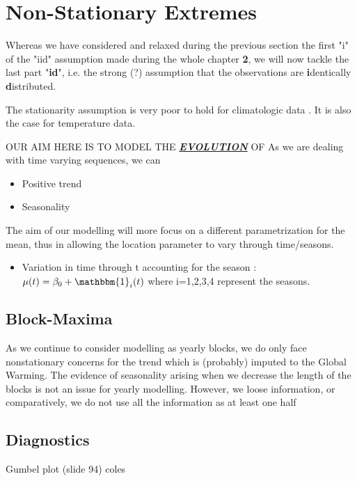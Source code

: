 \documentclass[11pt,a4paper,openany ]{book}
\begin{document}
\section{Non-Stationary Extremes}\label{nstatio}

Whereas we have considered and relaxed during the previous section the first "i" of the "iid" assumption made during the whole chapter \textbf{2}, we will now tackle the last part "\textbf{id}", i.e. the strong (?) assumption that the observations are \textbf{i}dentically \textbf{d}istributed.

The stationarity assumption is very poor to hold for climatologic data \cite{milly_climate_2008}. It is also the case for temperature data.

OUR AIM HERE IS TO MODEL THE \textbf{\textit{\underline{EVOLUTION}}} OF 
As we are dealing with time varying sequences, we can

\begin{itemize}
	\item Positive trend
	\item Seasonality
\end{itemize}

The aim of our modelling will more focus on a different parametrization for the mean, thus in allowing the location parameter to vary through time/seasons.

\begin{itemize}
	\item Variation in time through t accounting for the season : $\mu (t)=\beta_0+\mathbbm{1}_i(t)$ where i=1,2,3,4 represent the seasons.
\end{itemize}



\subsection{Block-Maxima}

As we continue to consider modelling as yearly blocks, we do only face nonstationary concerns for the trend which is (probably) imputed to the Global Warming. 
The evidence of seasonality arising when we decrease the length of the blocks is not an issue for yearly modelling. However, we loose information, or comparatively, we do not use all the information as at least one half 


\subsection{Diagnostics}
Gumbel plot (slide 94) coles
\end{document}

